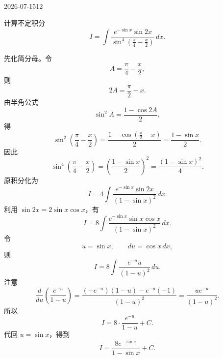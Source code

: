 \begin{mistake}{2026-07-15}{12}

\begin{problemcontent}
计算不定积分
\[
I=\int \frac{e^{-\sin x}\sin 2x}{\sin^4\left(\frac{\pi}{4}-\frac{x}{2}\right)}\,dx.
\]
\end{problemcontent}

\begin{solutioncontent}
先化简分母。令
\[
A=\frac{\pi}{4}-\frac{x}{2},
\]
则
\[
2A=\frac{\pi}{2}-x.
\]
由半角公式
\[
\sin^2 A=\frac{1-\cos 2A}{2},
\]
得
\[
\sin^2\left(\frac{\pi}{4}-\frac{x}{2}\right)
=\frac{1-\cos\left(\frac{\pi}{2}-x\right)}{2}
=\frac{1-\sin x}{2}.
\]
因此
\[
\sin^4\left(\frac{\pi}{4}-\frac{x}{2}\right)
=\left(\frac{1-\sin x}{2}\right)^2
=\frac{(1-\sin x)^2}{4}.
\]
原积分化为
\[
I=4\int \frac{e^{-\sin x}\sin 2x}{(1-\sin x)^2}\,dx.
\]
利用 \(\sin 2x=2\sin x\cos x\)，有
\[
I=8\int \frac{e^{-\sin x}\sin x\cos x}{(1-\sin x)^2}\,dx.
\]
令
\[
u=\sin x,\qquad du=\cos x\,dx,
\]
则
\[
I=8\int \frac{e^{-u}u}{(1-u)^2}\,du.
\]
注意
\[
\frac{d}{du}\left(\frac{e^{-u}}{1-u}\right)
=\frac{(-e^{-u})(1-u)-e^{-u}(-1)}{(1-u)^2}
=\frac{ue^{-u}}{(1-u)^2}.
\]
所以
\[
I=8\cdot \frac{e^{-u}}{1-u}+C.
\]
代回 \(u=\sin x\)，得到
\[
I=\frac{8e^{-\sin x}}{1-\sin x}+C.
\]
\end{solutioncontent}


\end{mistake}
